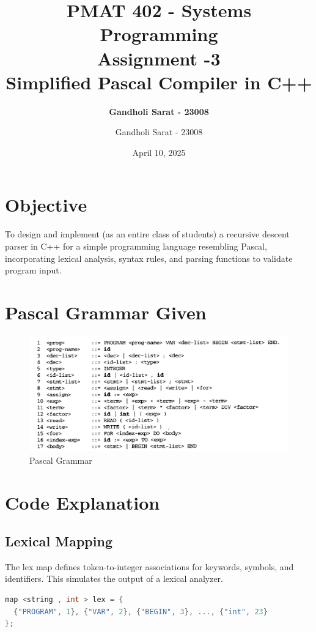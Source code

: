 \documentclass[12pt]{article}
\title{\textbf{PMAT 402 - Systems Programming \\ Assignment -3 \\ Simplified Pascal Compiler in C++}}
\author{\textbf{Gandholi Sarat - 23008}}
\author{Gandholi Sarat - 23008}
\date{April 10, 2025}
\begin{document}
\maketitle
\tableofcontents
\newpage

\section{Objective}
To design and implement (as an entire class of students) a recursive descent parser in C++
for a simple programming language resembling Pascal, incorporating lexical analysis, syntax
rules, and parsing functions to validate program input.

\section{Pascal Grammar Given}

\begin{figure}[H]
\centering
\includegraphics[width=\textwidth]{Pascal.png}
\caption{Pascal Grammar}
\label{fig:grammar}
\end{figure}

\section{Code Explanation}

\subsection{Lexical Mapping}
The lex map defines token-to-integer associations for keywords, symbols, and identifiers. This simulates the output of a lexical analyzer.

\begin{lstlisting}[language=C++]
map <string , int > lex = {
  {"PROGRAM", 1}, {"VAR", 2}, {"BEGIN", 3}, ..., {"int", 23}
};
\end{lstlisting}
\end{document}
